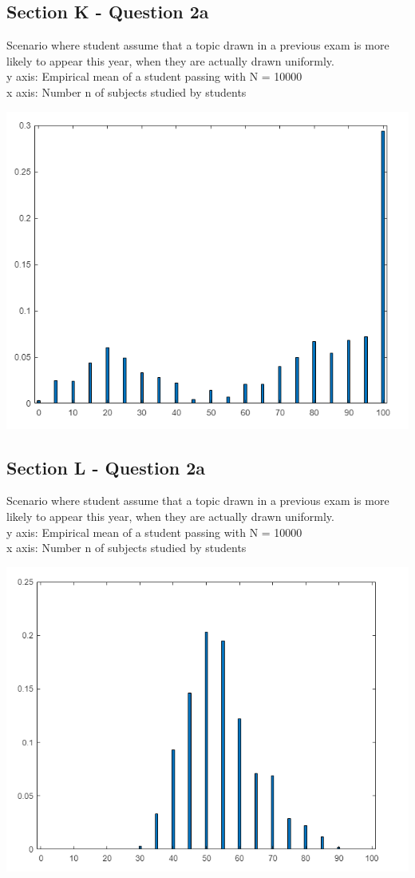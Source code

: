 \documentclass{article}
\begin{document}
\subsection*{Section K - Question 2a}
Scenario where student assume that a topic drawn in a previous exam is more likely
to appear this year, when they are actually drawn uniformly.\\
y axis: Empirical mean of a student passing with N = 10000 \\
x axis: Number n of subjects studied by students
\begin{center}
    \includegraphics[scale=0.5]{q2_a}
\end{center}

\subsection*{Section L - Question 2a}
Scenario where student assume that a topic drawn in a previous exam is more likely
to appear this year, when they are actually drawn uniformly.\\
y axis: Empirical mean of a student passing with N = 10000 \\
x axis: Number n of subjects studied by students
\begin{center}
    \includegraphics[scale=0.5]{q2_b}
\end{center}
\end{document}
